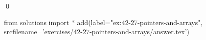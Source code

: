 
\begin{ex}
  \label{ex:42-27-pointers-and-arrays}
  
  \qed
\end{ex}
\begin{python0}
from solutions import *
add(label="ex:42-27-pointers-and-arrays",
    srcfilename='exercises/42-27-pointers-and-arrays/answer.tex')
\end{python0}
